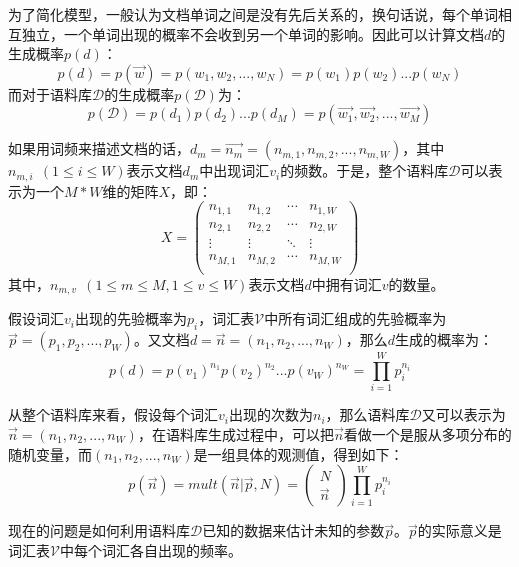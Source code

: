 为了简化模型，一般认为文档单词之间是没有先后关系的，换句话说，每个单词相互独立，一个单词出现的概率不会收到另一个单词的影响。因此可以计算文档$d$的生成概率$p(d)$：
\begin{equation}
  p(d)=p(\vec{w})=p(w_1,w_2,...,w_N)=p(w_1)p(w_2)...p(w_N)
\end{equation}
而对于语料库$\mathcal{D}$的生成概率$p(\mathcal{D})$为：
\begin{equation}
  p(\mathcal{D})=p(d_1)p(d_2)...p(d_M)=p(\vec{w_1},\vec{w_2},...,\vec{w_M})
\end{equation}

如果用词频来描述文档的话，$d_m=\vec{n_m}=(n_{m,1},n_{m,2},...,n_{m,W})$，其中$n_{m,i}~~(1\le i\le W)$表示文档$d_m$中出现词汇$v_i$的频数。于是，整个语料库$\mathcal{D}$可以表示为一个$M*W$维的矩阵$X$，即：
\begin{equation*}
  X=\left(
  \begin{array}{cccc}
    n_{1,1} & n_{1,2} & \cdots & n_{1,W} \\
    n_{2,1} & n_{2,2} & \cdots & n_{2,W} \\
    \vdots & \vdots & \ddots & \vdots \\ 
    n_{M,1} & n_{M,2} & \cdots & n_{M,W} \\
  \end{array}
  \right)
\end{equation*}
其中，$n_{m,v}~~(1\le m\le M,1\le v\le W)$表示文档$d$中拥有词汇$v$的数量。

假设词汇$v_i$出现的先验概率为$p_i$，词汇表$\mathcal{V}$中所有词汇组成的先验概率为$\vec{p}=(p_1,p_2,...,p_W)$。又文档$d=\vec{n}=(n_1,n_2,...,n_W)$，那么$d$生成的概率为：
\begin{equation}
  p(d)=p(v_1)^{n_1}p(v_2)^{n_2}...p(v_W)^{n_W}=\prod_{i=1}^{W}p_i^{n_i}
\end{equation}

从整个语料库来看，假设每个词汇$v_i$出现的次数为$n_i$，那么语料库$\mathcal{D}$又可以表示为$\vec{n}=(n_1,n_2,...,n_W)$，在语料库生成过程中，可以把$\vec{n}$看做一个是服从多项分布的随机变量，而$(n_1,n_2,...,n_W)$是一组具体的观测值，得到如下：
\begin{equation}
  \label{eq:vocmulti}
  p(\vec{n})=mult(\vec{n}|\vec{p},N)=
  \begin{pmatrix}
    N \\
    \vec{n}
  \end{pmatrix}
  \prod_{i=1}^Wp_i^{n_i}
\end{equation}

现在的问题是如何利用语料库$\mathcal{D}$已知的数据来估计未知的参数$\vec{p}$。$\vec{p}$的实际意义是词汇表$\mathcal{V}$中每个词汇各自出现的频率。

